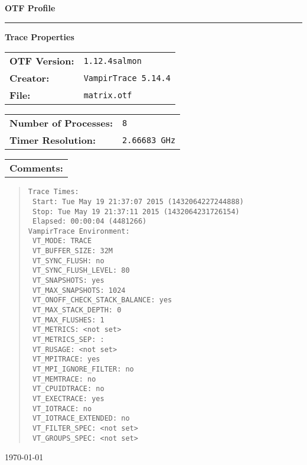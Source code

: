 \documentclass[a4paper,10pt]{article}
\begin{document}
\begin{titlepage}\thispagestyle{empty}
\begin{huge}\begin{flushleft}\bf{OTF Profile}\end{flushleft}\end{huge}
\hrule
\begin{flushright}\textbf{\large Trace Properties}\end{flushright}
\vspace{0.5\baselineskip}
\begin{flushleft}
\begin{tabular}{ll}
\bf{OTF Version:} & \verb|1.12.4salmon| \\
\bf{Creator:} & \verb|VampirTrace 5.14.4|\\
\bf{File:} & \verb|matrix.otf|
\end{tabular}

\vspace{1\baselineskip}
\begin{tabular}{ll}
\bf{Number of Processes:} & \verb|8|\\
\bf{Timer Resolution:} & \verb|2.66683 GHz|
\end{tabular}

\vspace{1\baselineskip}
\begin{tabular}{l}\bf{Comments:}\end{tabular}
\begin{quote}\begin{verbatim}
Trace Times:
 Start: Tue May 19 21:37:07 2015 (1432064227244888)
 Stop: Tue May 19 21:37:11 2015 (1432064231726154)
 Elapsed: 00:00:04 (4481266)
VampirTrace Environment:
 VT_MODE: TRACE
 VT_BUFFER_SIZE: 32M
 VT_SYNC_FLUSH: no
 VT_SYNC_FLUSH_LEVEL: 80
 VT_SNAPSHOTS: yes
 VT_MAX_SNAPSHOTS: 1024
 VT_ONOFF_CHECK_STACK_BALANCE: yes
 VT_MAX_STACK_DEPTH: 0
 VT_MAX_FLUSHES: 1
 VT_METRICS: <not set>
 VT_METRICS_SEP: :
 VT_RUSAGE: <not set>
 VT_MPITRACE: yes
 VT_MPI_IGNORE_FILTER: no
 VT_MEMTRACE: no
 VT_CPUIDTRACE: no
 VT_EXECTRACE: yes
 VT_IOTRACE: no
 VT_IOTRACE_EXTENDED: no
 VT_FILTER_SPEC: <not set>
 VT_GROUPS_SPEC: <not set>
\end{verbatim}\end{quote}
\end{flushleft}
\vspace*{\fill}
\begin{flushright}\today\end{flushright}
\end{titlepage}
\end{document}
